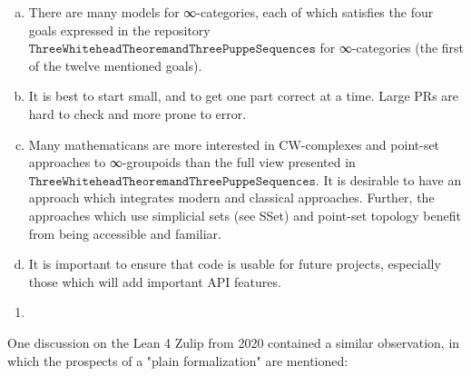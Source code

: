 \documentclass{book}
\begin{document}
\begin{enumerate}[(a)]
    \item There are many models for ∞-categories, each of which satisfies the four goals expressed in the repository $\texttt{ThreeWhiteheadTheoremandThreePuppeSequences}$ for ∞-categories (the first of the twelve mentioned goals). 
    \item It is best to start small, and to get one part correct at a time. Large PRs are hard to check and more prone to error.
    \item Many mathematicans are more interested in CW-complexes and point-set approaches to ∞-groupoids than the full view presented in $\texttt{ThreeWhiteheadTheoremandThreePuppeSequences}$. It is desirable to have an approach which integrates modern and classical approaches. Further, the approaches which use simplicial sets (see SSet) and point-set topology benefit from being accessible and familiar.
    \item It is important to ensure that code is usable for future projects, especially those which will add important API features.
    \end{enumerate}

\fi

\begin{enumerate}
\item 
\end{enumerate}


One discussion on the Lean 4 Zulip from 2020 contained a similar observation, in which the prospects of a "plain formalization" are mentioned:
\end{document}
